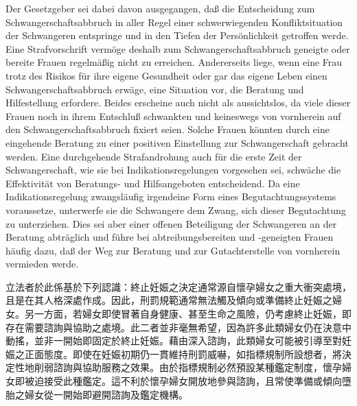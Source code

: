 \documentclass[12pt]{article}
\begin{document}
\syncleft
\begin{sourcepara}
Der Gesetzgeber sei dabei davon ausgegangen, daß die Entscheidung zum Schwangerschaftsabbruch in aller Regel einer schwerwiegenden Konfliktsituation der Schwangeren entspringe und in den Tiefen der Persönlichkeit getroffen werde. Eine Strafvorschrift vermöge deshalb zum Schwangerschaftsabbruch geneigte oder bereite Frauen regelmäßig nicht zu erreichen. Andererseits liege, wenn eine Frau trotz des Risikos für ihre eigene Gesundheit oder gar das eigene Leben einen Schwangerschaftsabbruch erwäge, eine Situation vor, die Beratung und Hilfestellung erfordere. Beides erscheine auch nicht als aussichtslos, da viele dieser Frauen noch in ihrem Entschluß schwankten und keineswegs von vornherein auf den Schwangerschaftsabbruch fixiert seien. Solche Frauen könnten durch eine eingehende Beratung zu einer positiven Einstellung zur Schwangerschaft gebracht werden. Eine durchgehende Strafandrohung auch für die erste Zeit der Schwangerschaft, wie sie bei Indikationsregelungen vorgesehen sei, schwäche die Effektivität von Beratungs- und Hilfsangeboten entscheidend. Da eine Indikationsregelung zwangsläufig irgendeine Form eines Begutachtungssystems voraussetze, unterwerfe sie die Schwangere dem Zwang, sich dieser Begutachtung zu unterziehen. Dies sei aber einer offenen Beteiligung der Schwangeren an der Beratung abträglich und führe bei abtreibungsbereiten und -geneigten Frauen häufig dazu, daß der Weg zur Beratung und zur Gutachterstelle von vornherein vermieden werde.
\end{sourcepara}
\begin{transpara}
立法者於此係基於下列認識：終止妊娠之決定通常源自懷孕婦女之重大衝突處境，且是在其人格深處作成。因此，刑罰規範通常無法觸及傾向或準備終止妊娠之婦女。另一方面，若婦女即使冒著自身健康、甚至生命之風險，仍考慮終止妊娠，即存在需要諮詢與協助之處境。此二者並非毫無希望，因為許多此類婦女仍在決意中動搖，並非一開始即固定於終止妊娠。藉由深入諮詢，此類婦女可能被引導至對妊娠之正面態度。即使在妊娠初期仍一貫維持刑罰威嚇，如指標規制所設想者，將決定性地削弱諮詢與協助服務之效果。由於指標規制必然預設某種鑑定制度，懷孕婦女即被迫接受此種鑑定。這不利於懷孕婦女開放地參與諮詢，且常使準備或傾向墮胎之婦女從一開始即避開諮詢及鑑定機構。
\end{transpara}
\end{document}
